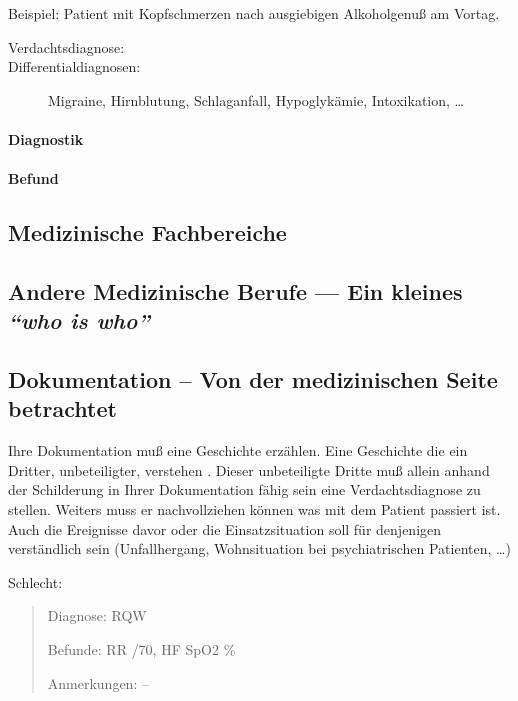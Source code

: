 Beispiel: Patient mit Kopfschmerzen nach ausgiebigen
Alkoholgenuß am Vortag.
\begin{description}
    \item[Verdachtsdiagnose:] 
    \item[Differentialdiagnosen:]
    Migraine, Hirnblutung, Schlaganfall,
    Hypoglykämie, Intoxikation, \ldots
\end{description}
\paragraph{Diagnostik}
\paragraph{Befund}

\subsection{Medizinische Fachbereiche}

\subsection{Andere Medizinische Berufe --- Ein kleines
\emph{"`who is who"'}}

\subsection{Dokumentation -- Von der medizinischen Seite
betrachtet}

Ihre Dokumentation muß eine Geschichte erzählen. Eine
Geschichte die ein Dritter, unbeteiligter, verstehen
. Dieser unbeteiligte Dritte muß allein anhand der
Schilderung in Ihrer Dokumentation fähig sein eine
Verdachtsdiagnose zu stellen. Weiters muss er
nachvollziehen können was mit dem Patient passiert ist.
Auch die Ereignisse davor oder die Einsatzsituation soll
für denjenigen verständlich sein (Unfallhergang,
Wohnsituation bei psychiatrischen Patienten, \ldots)

Schlecht:
\begin{quote}

{\sffamily Diagnose:} {\ttfamily RQW}

{\sffamily Befunde:} {\sffamily RR} {/70,}
{\sffamily HF} {} {\sffamily SpO2}
{\% }

{\sffamily Anmerkungen: --}
\end{quote}

